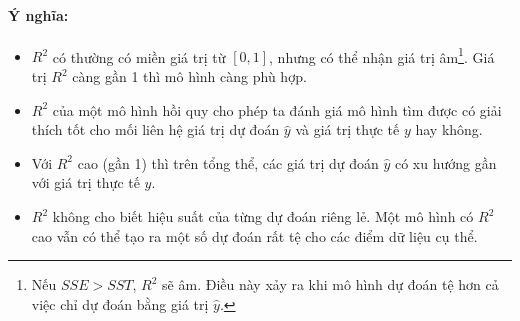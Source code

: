 \paragraph{Ý nghĩa:}{}
\begin{itemize}
\item $R^2$ có thường có miền giá trị từ $[0,1]$, nhưng có thể nhận giá trị âm\footnote{Nếu $SSE > SST$, $R^2$ sẽ âm. Điều này xảy ra khi mô hình dự đoán tệ hơn cả việc chỉ dự đoán bằng giá trị $\hat{y}$.}. Giá trị $R^2$ càng gần 1 thì mô hình càng phù hợp. 
\item $R^2$ của một mô hình hồi quy cho phép ta đánh giá mô hình tìm được có giải thích tốt cho mối liên hệ giá trị dự đoán $\hat{y}$ và giá trị thực tế $y$ hay không.
\item Với $R^2$ cao (gần 1) thì trên tổng thể, các giá trị dự đoán $\hat{y}$ có xu hướng gần với giá trị thực tế $y$.
\item $R^2$ không cho biết hiệu suất của từng dự đoán riêng lẻ. Một mô hình có $R^2$ cao vẫn có thể tạo ra một số dự đoán rất tệ cho các điểm dữ liệu cụ thể.

\end{itemize}

\pagebreak